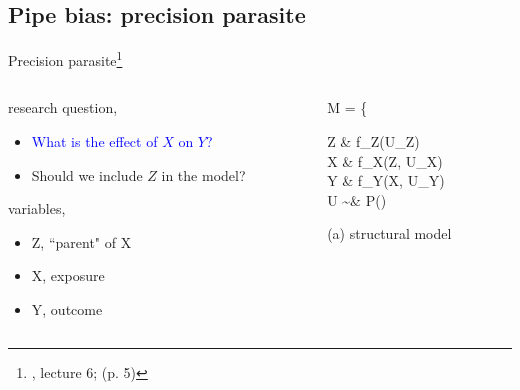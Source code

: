 %
%
\subsection{Pipe bias: precision parasite}
%
%
\begin{frame}[t, negative]
	\subsectionpage
\end{frame}
%
%
\begin{frame}
	{Precision parasite\footnote{\citet{McElreath_2022}, lecture 6; \citet{Cinelli_et_al_2021} (p. 5)}}
	\begin{columns}
		\begin{column}{0.5\textwidth}
			research question, 
			\begin{itemize}
				\item \textcolor{blue}{What is the effect of $X$ on $Y$?}
				\item Should we include $Z$ in the model?
			\end{itemize}
			
			variables,
			\begin{itemize}
				\item Z, ``parent" of X
				\item X, exposure
				\item Y, outcome
			\end{itemize}
		\end{column}
		\begin{column}{0.5\textwidth}  
			\begin{equ}
				M = \left\{ \begin{aligned} 
					Z \leftarrow & \; f_{Z}(U_{Z}) \\
					X \leftarrow & \; f_{X}(Z, U_{X}) \\
					Y \leftarrow & \; f_{Y}(X, U_{Y}) \\
					U \sim & \; P()
				\end{aligned} \right
				\caption*{(a) structural model}
			\end{equ}
			\begin{figure}
\end{figure}
\end{column}
\end{columns}
\end{frame}
